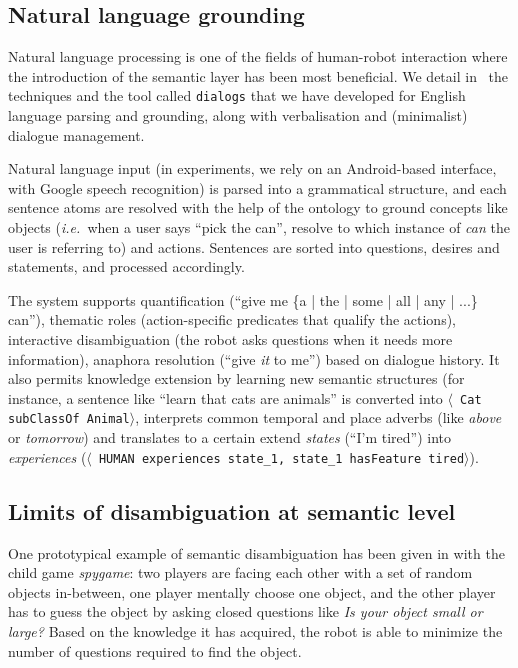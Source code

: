 \documentclass[letterpaper, 10 pt, conference]{ieeeconf}  %
\newcommand{\stmt}[1]{{\footnotesize \tt $\langle$ #1\relax$\rangle$}}
\newcommand{\ie}{{\textit{i.e.\ }}}
\begin{document}
\subsection{Natural language grounding}

Natural language processing is one of the fields of human-robot interaction
where the introduction of the semantic layer has been most beneficial.
We detail in~\cite{Lemaignan2011a} the techniques and the tool called
\texttt{dialogs} that we have developed for English language parsing and
grounding, along with verbalisation and (minimalist) dialogue management.

Natural language input (in experiments, we rely on an Android-based interface,
with Google speech recognition) is parsed into a grammatical structure, and
each sentence atoms are resolved with the help of the ontology to ground
concepts like objects (\ie when a user says ``pick the can'', resolve to which
instance of \emph{can} the user is referring to) and actions. Sentences are
sorted into questions, desires and statements, and processed accordingly.

The system supports quantification (``give me \{a | the | some | all | any | ...\} can''),
thematic roles (action-specific predicates that qualify the actions), interactive disambiguation (the robot asks
questions when it needs more information), anaphora resolution (``give \emph{it} to me'') based on
dialogue history. It also permits knowledge extension by learning new semantic
structures (for instance, a sentence like ``learn that cats are animals'' is
converted into \stmt{Cat subClassOf Animal}, interprets common temporal and place adverbs (like \emph{above} or \emph{tomorrow}) and translates to a certain extend \emph{states} (``I'm tired'') into
\emph{experiences} (\stmt{HUMAN experiences state\_1, state\_1 hasFeature
tired}).

\subsection{Limits of disambiguation at semantic level}

One prototypical example of semantic disambiguation has been given in
\cite{Ros2010b} with the child game \emph{spygame}: two players are facing
each other with a set of random objects in-between, one player mentally choose
one object, and the other player has to guess the object by asking closed
questions like \emph{Is your object small or large?} Based on the knowledge it
has acquired, the robot is able to minimize the number of questions required to
find the object.
\end{document}
